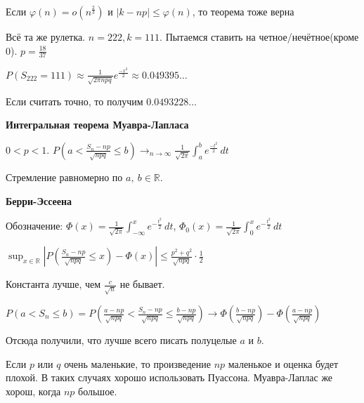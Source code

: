 \begin{remark}
    Если $\varphi (n) = o(n^\frac{2}{3})$ и $|k - np| \leqslant \varphi (n)$, то теорема тоже верна
\end{remark}

\begin{example}
    Всё та же рулетка. $n = 222, k = 111$. Пытаемся ставить на четное/нечётное(кроме 0). $p = \frac{18}{37}$

    $P(S_{222} = 111) \approx \frac{1}{\sqrt{2 \pi n p q}} e^{\frac{-x^2}{2}} \approx 0.049395\ldots$

    Если считать точно, то получим $0.0493228\ldots$
\end{example}

\begin{theorem}
    \textbf{Интегральная теорема Муавра-Лапласа}

    $0 < p < 1$. $P(a < \frac{S_n - np}{\sqrt{npq}} \leqslant b) \rightarrow_{n \to \infty} \frac{1}{\sqrt{2\pi}} \int_a^b e^{\frac{-t^2}{2}} \, dt$

    Стремление равномерно по $a, \ b \in \mathbb{R}$.
\end{theorem}

\begin{theorem}
    \textbf{Берри-Эссеена}

    Обозначение: $\Phi (x) = \frac{1}{\sqrt{2\pi}} \int_{-\infty}^x e^{-\frac{t^2}{2}} \, dt$, $\Phi_0 (x) = \frac{1}{\sqrt{2\pi}} \int_{0}^x e^{-\frac{t^2}{2}} \, dt$

    $\sup_{x\in \mathbb{R}}\left| P(\frac{S_n - np}{\sqrt{npq}} \leqslant x) - \Phi (x) \right| \leqslant \frac{p^2 + q^2}{\sqrt{npq}} \cdot \frac{1}{2}$

    \begin{remark}
        Константа лучше, чем $\frac{c}{\sqrt{n}}$ не бывает.
    \end{remark}

    \begin{remark}
        $P(a < S_n \leqslant b) = P(\frac{a - np}{\sqrt{npq}} < \frac{S_n - np}{\sqrt{npq}} \leqslant \frac{b - np}{\sqrt{npq}}) \to
        \Phi (\frac{b - np}{\sqrt{npq}}) - \Phi (\frac{a - np}{\sqrt{npq}})$

        Отсюда получили, что лучше всего писать полуцелые $a$ и $b$.
    \end{remark}

    \begin{remark}
        Если $p$ или $q$ очень маленькие, то произведение $np$ маленькое и оценка будет плохой. В таких случаях хорошо
        использовать Пуассона. Муавра-Лаплас же хорош, когда $np$ большое.
    \end{remark}
\end{theorem}


